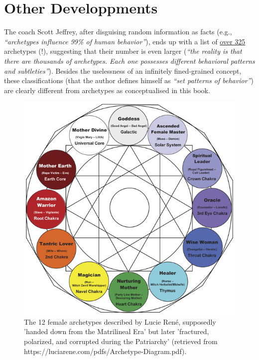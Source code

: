 \documentclass[
]{book}
\begin{document}
\hypertarget{other-developpments}{%
\section{Other Developpments}\label{other-developpments}}

The coach Scott Jeffrey, after disguising random information as facts (e.g., \emph{``archetypes influence 99\% of human behavior''}), ends up with a list of \href{https://scottjeffrey.com/archetypes-list/}{over 325} archetypes (!), suggesting that their number is even larger (\emph{``the reality is that there are thousands of archetypes. Each one possesses different behavioral patterns and subtleties''}). Besides the uselessness of an infinitely fined-grained concept, these classifications (that the author defines himself as \emph{``set patterns of behavior''}) are clearly different from archetypes as conceptualised in this book.

\begin{figure}

{\centering \includegraphics[width=\textwidth]{img/female_archetypes} 

}

\caption{The 12 female archetypes described by Lucie René, supposedly 'handed down from the Matrilineal Era' but later 'fractured, polarized, and corrupted during the Patriarchy' (retrieved from https://luciarene.com/pdfs/Archetype-Diagram.pdf).}\label{fig:unnamed-chunk-13}
\end{figure}
\end{document}
